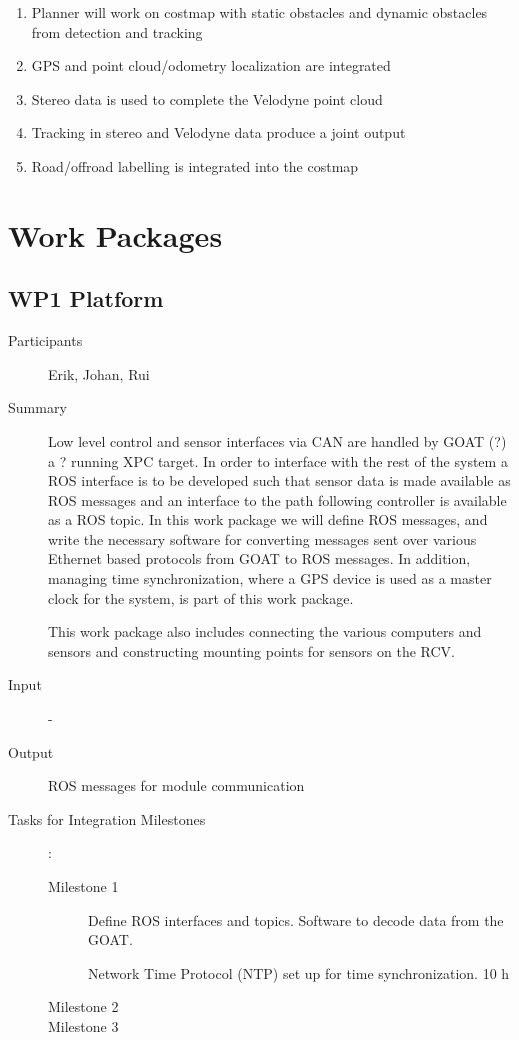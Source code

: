 \documentclass[11pt,a4paper]{article}
\begin{document}
\begin{enumerate}
\item Planner will work on costmap with static obstacles and dynamic obstacles from detection and tracking
\item GPS and point cloud/odometry localization are integrated
\item Stereo data is used to complete the Velodyne point cloud
\item Tracking in stereo and Velodyne data produce a joint output
\item Road/offroad labelling is integrated into the costmap
\end{enumerate}

\section{Work Packages}

\subsection{WP1 Platform} %

\begin{description}
\item[Participants] Erik, Johan, Rui
\item[Summary] Low level control and sensor interfaces via CAN are
  handled by GOAT (?)  a ? running XPC target. In order to interface
  with the rest of the system a ROS interface is to be developed such
  that sensor data is made available as ROS messages and an interface
  to the path following controller is available as a ROS topic. In this
  work package we will define ROS messages, and write the necessary
  software for converting messages sent over various Ethernet based
  protocols from GOAT to ROS messages. In addition, managing time
  synchronization, where a GPS device is used as a master clock for the
  system, is part of this work package.

  This work package also includes connecting the various computers and
  sensors and constructing mounting points for sensors on the RCV.
   
\item[Input] -
\item[Output] ROS messages for module communication
\item[Tasks for Integration Milestones]:\
	\begin{description}
		\item[Milestone 1] Define ROS interfaces and topics. Software to decode data from the GOAT. 

  Network Time Protocol (NTP) set up for time synchronization. 10 h
		\item[Milestone 2]
		\item[Milestone 3] 
	\end{description}	 
\end{description}
\end{document}
